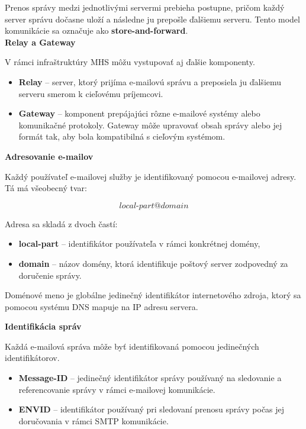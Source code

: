 \documentclass[conference]{IEEEtran}
\begin{document}
Prenos správy medzi jednotlivými servermi prebieha postupne, pričom každý server 
správu dočasne uloží a následne ju prepošle ďalšiemu serveru. 
Tento model komunikácie sa označuje ako \textbf{store-and-forward}\cite{rfc5598}.\\

\textbf{Relay a Gateway}

V rámci infraštruktúry MHS môžu vystupovať aj ďalšie komponenty\cite{rfc5598}.

\begin{itemize}
\item \textbf{Relay} – server, ktorý prijíma e-mailovú správu a preposiela ju 
ďalšiemu serveru smerom k cieľovému príjemcovi.
\item \textbf{Gateway} – komponent prepájajúci rôzne e-mailové systémy alebo 
komunikačné protokoly. Gateway môže upravovať obsah správy alebo jej formát 
tak, aby bola kompatibilná s cieľovým systémom.
\end{itemize}

\textbf{Adresovanie e-mailov}

Každý používateľ e-mailovej služby je identifikovaný pomocou e-mailovej adresy. 
Tá má všeobecný tvar\cite{rfc5598}:

\[
local\text{-}part@domain
\]

Adresa sa skladá z dvoch častí\cite{rfc5598}:

\begin{itemize}
\item \textbf{local-part} – identifikátor používateľa v rámci konkrétnej domény,
\item \textbf{domain} – názov domény, ktorá identifikuje poštový server zodpovedný 
za doručenie správy.
\end{itemize}

Doménové meno je globálne jedinečný identifikátor internetového zdroja, 
ktorý sa pomocou systému DNS mapuje na IP adresu servera\cite{rfc5598}.

\textbf{Identifikácia správ}

Každá e-mailová správa môže byť identifikovaná pomocou jedinečných identifikátorov\cite{rfc5598}.

\begin{itemize}
\item \textbf{Message-ID} – jedinečný identifikátor správy používaný na sledovanie 
a referencovanie správy v rámci e-mailovej komunikácie\cite{rfc5598}.
\item \textbf{ENVID} – identifikátor používaný pri sledovaní prenosu správy 
počas jej doručovania v rámci SMTP komunikácie\cite{rfc5598}.
\end{itemize}
\end{document}
